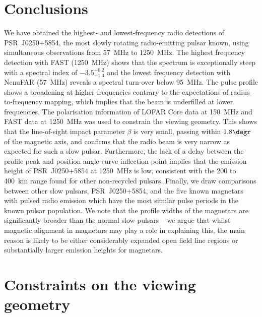 \section{Conclusions}
\label{sec: J0250 - conclusions}

We have obtained the highest- and lowest-frequency radio detections of PSR~J0250+5854, the most slowly rotating radio-emitting pulsar known, using simultaneous observations from 57~MHz to 1250~MHz. The highest frequency detection with FAST (1250~MHz) shows that the spectrum is exceptionally steep with a spectral index of $-3.5^{+0.2}_{-1.4}$ and the lowest frequency detection with NenuFAR (57~MHz) reveals a spectral turn-over below 95~MHz. The pulse profile shows a broadening at higher frequencies contrary to the expectations of radius-to-frequency mapping, which implies that the beam is underfilled at lower frequencies. The polarisation information of LOFAR Core data at 150~MHz and FAST data at 1250~MHz was used to constrain the viewing geometry. This shows that the line-of-sight impact parameter $\beta$ is very small, passing within $1.8\degr$ of the magnetic axis, and confirms that the radio beam is very narrow as expected for such a slow pulsar. Furthermore, the lack of a delay between the profile peak and position angle curve inflection point implies that the emission height of PSR~J0250+5854 at 1250~MHz is low, consistent with the 200 to 400~km range found for other non-recycled pulsars. Finally, we draw comparisons between other slow pulsars, PSR~J0250+5854, and the five known magnetars with pulsed radio emission which have the most similar pulse periods in the known pulsar population. We note that the profile widths of the magnetars are significantly broader than the normal slow pulsars -- we argue that whilst magnetic alignment in magnetars may play a role in explaining this, the main reason is likely to be either considerably expanded open field line regions or substantially larger emission heights for magnetars.





















\section{Constraints on the viewing geometry}
\label{app: expanded geometry derivation}

